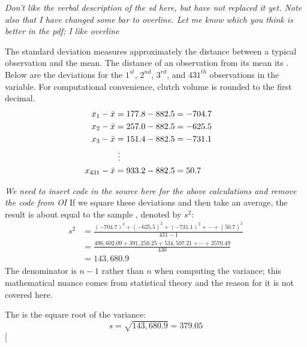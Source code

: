 \begin{doublespace}
\textit{Don't like the verbal description of the sd here, but have not replaced it yet.  Note also that I have changed some bar to overline.  Let me know which you think is better in the pdf; I like overline}

The standard deviation measures approximately the distance between a  typical observation and the mean. The distance of an observation from its mean its . Below are the deviations for the $1^{st}$, $2^{nd}$, $3^{rd}$, and $431^{th}$ observations in the  variable. For computational convenience, clutch volume is rounded to the first decimal.
\begin{align*}
x_1-\bar{x} &= 177.8 - 882.5 = -704.7 \hspace{5mm}\text{ } \\
x_2-\bar{x} &= 257.0 - 882.5 = -625.5 \\
x_3-\bar{x} &= 151.4 - 882.5 = -731.1 \\
&\ \vdots \\
x_{431}-\bar{x} &= 933.2 - 882.5 = 50.7
\end{align*}

\textit{We need to insert code in the source here for the above calculations and remove the code from OI}
If we square these deviations and then take an average, the result is about equal to the sample \label{varianceIsDefined}, denoted by $s^2$:
\begin{align*}
s^2 &= \frac{(-704.7)^2 + (-625.5)^2 + (-731.1)^2 + \cdots + (50.7)^2}{431-1} \\
&= \frac{496,602.09 + 391,250.25 + 534,507.21 + \cdots + 2570.49}{430} \\
&= 143,680.9
\end{align*}
The denominator is $n-1$ rather than $n$ when computing the variance; this mathematical nuance comes from statistical theory and the reason for it is not covered here.

The  is the square root of the variance:
$$s=\sqrt{143,680.9} = 379.05$$
\marginpar[\raggedright\vspace{-10mm}


\end{doublespace}
